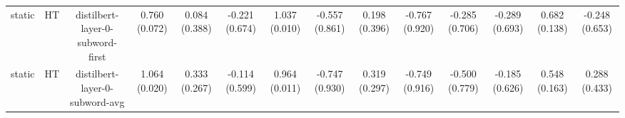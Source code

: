 \begin{sidewaystable}[htb]
\begin{tabular}{@{}cccccccccccccc@{}}
        static & HT & distilbert-layer-0-subword-first & 0.760 (0.072) & 0.084 (0.388) & -0.221 (0.674) & 1.037 (0.010) & -0.557 (0.861) & 0.198 (0.396) & -0.767 (0.920) & -0.285 (0.706) & -0.289 (0.693) & 0.682 (0.138) & -0.248 (0.653) \\
        static & HT & distilbert-layer-0-subword-avg & 1.064 (0.020) & 0.333 (0.267) & -0.114 (0.599) & 0.964 (0.011) & -0.747 (0.930) & 0.319 (0.297) & -0.749 (0.916) & -0.500 (0.779) & -0.185 (0.626) & 0.548 (0.163) & 0.288 (0.433) \\
        \bottomrule
    \end{tabular}
\end{sidewaystable}